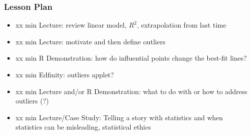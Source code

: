 \begin{frame}
    \frametitle{Lesson Plan}
    \begin{itemize}
        \item xx min Lecture: review linear model, $R^2$, extrapolation from last time
        \item xx min Lecture: motivate and then define outliers
        \item xx min R Demonstration: how do influential points change the best-fit lines?
        \item xx min Edfinity: outliers applet?
        \item xx min Lecture and/or R Demonstration: what to do with or how to address outliers (?)  %
        \item xx min Lecture/Case Study: Telling a story with statistics and when statistics can be misleading, statistical ethics
    \end{itemize}
\end{frame}


